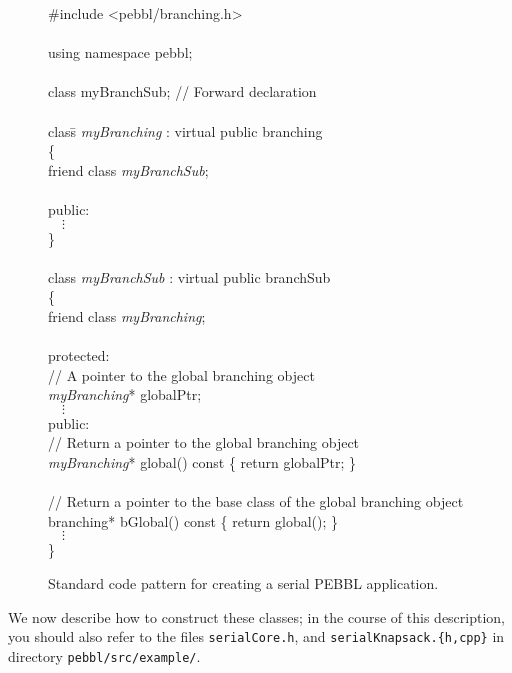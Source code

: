 \begin{figure}[tbp]
\begin{codeblock}
\#include <pebbl/branching.h> \\
\\
using namespace pebbl; \\
\\
class myBranchSub;  // Forward declaration \\
\\
clas\=s \emph{myBranching} : virtual public branching \\
\{\\
\>friend class \emph{myBranchSub}; \\
\\
public:\\
$\quad\vdots$ \\
\} \\
\\
class \emph{myBranchSub} : virtual public branchSub \\
\{\\
\>friend class \emph{myBranching}; \\
\\
protected:\\
\>// A pointer to the global branching object\\
\> \emph{myBranching}* globalPtr;\\
$\quad\vdots$ \\
public:\\
\>  // Return a pointer to the global branching object\\
\>  \emph{myBranching}* global() const \{ return globalPtr; \}\\
\\
\>  // Return a pointer to the base class of the global branching object \\
\>  branching* bGlobal() const \{ return global(); \}\\
$\quad\vdots$ \\
\}
\end{codeblock}
\vspace{-2ex}
\caption{Standard code pattern for creating a serial PEBBL application.}
\label{fig:code1}
\end{figure}

We now describe how to construct these classes; in the course of this
description, you should also refer to the files \texttt{serialCore.h},
and \texttt{serialKnapsack.\{h,cpp\}}
in directory \texttt{pebbl/src/example/}.

